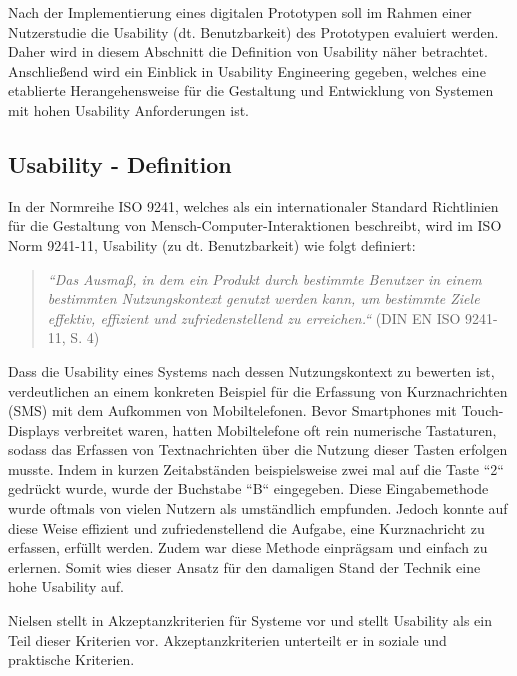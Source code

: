 Nach der Implementierung eines digitalen Prototypen soll im Rahmen einer Nutzerstudie die Usability (dt. Benutzbarkeit) des Prototypen evaluiert werden.
Daher wird in diesem Abschnitt die Definition von Usability näher betrachtet. Anschließend wird ein Einblick in Usability Engineering gegeben, welches eine etablierte Herangehensweise für
die Gestaltung und Entwicklung von Systemen mit hohen Usability Anforderungen ist. 

\subsection{Usability - Definition} \label{UsaDef}

In der Normreihe ISO 9241, welches als ein internationaler Standard Richtlinien für die Gestaltung von Mensch-Computer-Interaktionen beschreibt, wird im ISO Norm 9241-11,  Usability (zu dt. Benutzbarkeit) wie folgt definiert:

\begin{quote}\textit{``Das Ausmaß, in dem ein Produkt durch bestimmte Benutzer in einem bestimmten Nutzungskontext genutzt werden kann, um bestimmte Ziele effektiv, effizient und zufriedenstellend zu erreichen.``} (DIN EN ISO 9241-11, S. 4)\end{quote}

Dass die Usability eines Systems nach dessen Nutzungskontext zu bewerten ist, verdeutlichen \citeauthor{MichaelRichter2016} an einem konkreten Beispiel für die Erfassung 
von Kurznachrichten (SMS) mit dem Aufkommen von Mobiltelefonen. Bevor Smartphones mit Touch-Displays verbreitet waren, hatten Mobiltelefone oft rein numerische Tastaturen, sodass das Erfassen 
von Textnachrichten über die Nutzung dieser Tasten erfolgen musste. Indem in kurzen Zeitabständen beispielsweise zwei mal auf die Taste ``2`` gedrückt wurde, wurde der Buchstabe 
``B`` eingegeben. Diese Eingabemethode wurde oftmals von vielen Nutzern als umständlich empfunden. Jedoch konnte auf diese Weise effizient und zufriedenstellend die Aufgabe, eine Kurznachricht 
zu erfassen, erfüllt werden. Zudem war diese Methode einprägsam und einfach zu erlernen. Somit wies dieser Ansatz für den damaligen Stand der Technik eine hohe Usability auf. \cite[S.~10]{MichaelRichter2016} 

Nielsen stellt in \cite[S.~25]{Nielsen1994} Akzeptanzkriterien für Systeme vor und stellt Usability als ein Teil dieser Kriterien vor.
Akzeptanzkriterien unterteilt er in soziale und praktische Kriterien.

